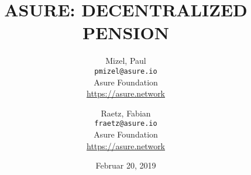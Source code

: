 
\title{ASURE: DECENTRALIZED PENSION}
\author{
  Mizel, Paul\\
  \texttt{pmizel@asure.io}\\
  Asure Foundation \\ 
  {\url{https://asure.network}}\\
  \and
  Raetz, Fabian\\
  \texttt{fraetz@asure.io}\\
  Asure Foundation \\ 
  {\url{https://asure.network}}\\
}

\date{Februar 20, 2019}
\maketitle

